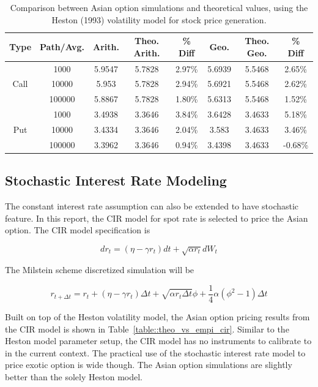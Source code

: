 \documentclass[a4paper,11pt] {article}
\begin{document}
\begin{table}[htb]
\begin{center}
\begin{tabular}{c||c|c|c|c|c|c|c}
  \hline
  Type & Path/Avg. & Arith. & Theo. Arith. & \% Diff & Geo. & Theo. Geo. & \% Diff \\ \hline
\multirow{3}{*}{Call}	&	1000	&	5.9547	&	5.7828	&	2.97\%	&	5.6939	&	5.5468	&	2.65\%	\\
&	10000	&	5.953	&	5.7828	&	2.94\%	&	5.6921	&	5.5468	&	2.62\%	\\
&	100000	&	5.8867	&	5.7828	&	1.80\%	&	5.6313	&	5.5468	&	1.52\%	\\ \hline
\multirow{3}{*}{Put}	&	1000	&	3.4938	&	3.3646	&	3.84\%	&	3.6428	&	3.4633	&	5.18\%	\\
&	10000	&	3.4334	&	3.3646	&	2.04\%	&	3.583	&	3.4633	&	3.46\%	\\
&	100000	&	3.3962	&	3.3646	&	0.94\%	&	3.4398	&	3.4633	&	-0.68\%	\\
  \hline
\end{tabular}
\caption{Comparison between Asian option simulations and theoretical values, using the Heston (1993) volatility model for stock price generation.}
\label{table::theo_vs_empi_heston}
\end{center}
\end{table}

\subsection{Stochastic Interest Rate Modeling}
The constant interest rate assumption can also be extended to have stochastic feature. In this report, the CIR model for spot rate is selected to price the Asian option. The CIR model specification is

$$
dr_t = (\eta-\gamma r_t) dt + \sqrt{\alpha r_t} d W_t
$$

The Milstein scheme discretized simulation will be

$$
r_{t+\Delta t} = r_t + (\eta-\gamma r_t) \Delta t + \sqrt{\alpha r_t \Delta t} \phi + \frac{1}{4} \alpha (\phi^2-1) \Delta t
$$

Built on top of the Heston volatility model, the Asian option pricing results from the CIR model is shown in Table~\ref{table::theo_vs_empi_cir}. Similar to the Heston model parameter setup, the CIR model has no instruments to calibrate to in the current context. The practical use of the stochastic interest rate model to price exotic option is wide though. The Asian option simulations are slightly better than the solely Heston model.
\end{document}

